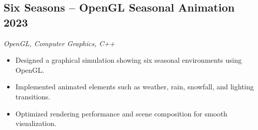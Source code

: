 \subsection{Six Seasons – OpenGL Seasonal Animation \hfill 2023}
\textit{OpenGL, Computer Graphics, C++}
\begin{itemize}
  \item Designed a graphical simulation showing six seasonal environments using OpenGL.
  \item Implemented animated elements such as weather, rain, snowfall, and lighting transitions.
  \item Optimized rendering performance and scene composition for smooth visualization.
\end{itemize}

